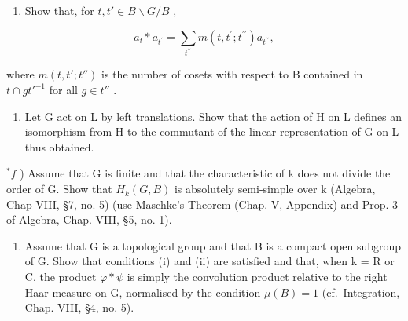 \begin{enumerate}
\def\labelenumi{\alph{enumi})}
\setcounter{enumi}{3}
\tightlist
\item
  Show that, for \(t, t' \in B \backslash G / B\) ,
\end{enumerate}

\[
a _ {t} * a _ {t ^ {\prime}} = \sum_ {t ^ {\prime \prime}} m (t, t ^ {\prime}; t ^ {\prime \prime}) a _ {t ^ {\prime \prime}},
\]

where \(m(t, t'; t'')\) is the number of cosets with respect to B contained in \(t \cap gt'^{-1}\) for all \(g \in t''\) .

\begin{enumerate}
\def\labelenumi{\alph{enumi})}
\setcounter{enumi}{4}
\tightlist
\item
  Let G act on L by left translations. Show that the action of H on L defines an isomorphism from H to the commutant of the linear representation of G on L thus obtained.
\end{enumerate}

\(^{*}f\) ) Assume that G is finite and that the characteristic of k does not divide the order of G. Show that \(H_{k}(G,B)\) is absolutely semi-simple over k (Algebra, Chap VIII, §7, no. 5) (use Maschke's Theorem (Chap. V, Appendix) and Prop. 3 of Algebra, Chap. VIII, §5, no. 1).

\begin{enumerate}
\def\labelenumi{\alph{enumi})}
\setcounter{enumi}{6}
\tightlist
\item
  Assume that G is a topological group and that B is a compact open subgroup of G. Show that conditions (i) and (ii) are satisfied and that, when k = R or C, the product \(\varphi * \psi\) is simply the convolution product relative to the right Haar measure on G, normalised by the condition \(\mu(B) = 1\) (cf.~Integration, Chap. VIII, §4, no. 5).
\end{enumerate}
